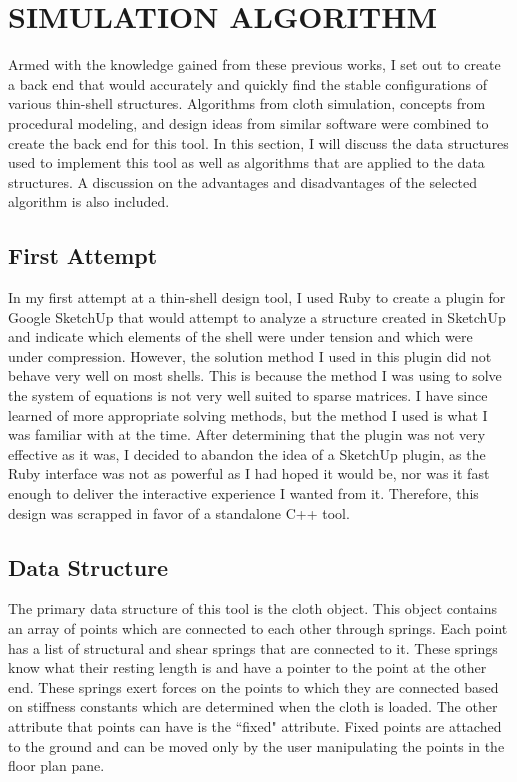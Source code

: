 \documentclass{thesis}
\begin{document}
\chapter{SIMULATION ALGORITHM}
Armed with the knowledge gained from these previous works, I set out to create a back end that would accurately
and quickly find the stable configurations of various thin-shell structures.  Algorithms from cloth simulation,
concepts from procedural modeling, and design ideas from similar software were combined to create the back end for
this tool.  In this section, I will discuss the data structures used to implement this tool as well as algorithms
that are applied to the data structures.  A discussion on the advantages and disadvantages of the selected algorithm
is also included.

\section{First Attempt}
\label{sec:initial}
In my first attempt at a thin-shell design tool, I used Ruby to create a plugin for Google SketchUp\cite{sketchup} that would attempt to analyze
a structure created in SketchUp and indicate which elements of the shell were under tension and which were under compression.
However, the solution method I used in this plugin did not behave very well on most shells.  This is because the method I was
using to solve the system of equations is not very well suited to sparse matrices.  I have since learned of more appropriate
solving methods, but the method I used is what I was familiar with at the time.  After determining that the plugin was not
very effective as it was, I decided to abandon the idea of a SketchUp plugin, as the Ruby interface was not as powerful as I had
hoped it would be, nor was it fast enough to deliver the interactive experience I wanted from it.  Therefore, this design was
scrapped in favor of a standalone C++ tool.

\section{Data Structure}
The primary data structure of this tool is the cloth object.  This object contains an array of points which are connected to each
other through springs. Each point has a list of structural and shear springs that are connected to it.  These springs know what
their resting length is and have a pointer to the point at the other end.  These springs exert forces on the points to which they
are connected based on stiffness constants which are determined when the cloth is loaded.  The other attribute that points can
have is the ``fixed" attribute.  Fixed points are attached to the ground and can be moved only by the user manipulating the
points in the floor plan pane.
\end{document}
